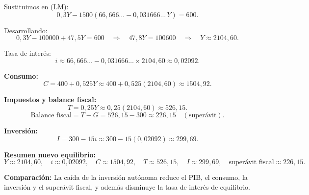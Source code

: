 \documentclass[11pt,addpoints]{article}
\begin{document}
Sustituimos en (LM):
\[
0{,}3Y - 1500\left(66{,}666\ldots - 0{,}031666\ldots\,Y\right) = 600.
\]

Desarrollando:
\[
0{,}3Y - 100000 + 47{,}5Y = 600
\quad\Rightarrow\quad
47{,}8Y = 100600
\quad\Rightarrow\quad
Y \approx 2104{,}60.
\]

Tasa de interés:
\[
i \approx 66{,}666\ldots - 0{,}031666\ldots \times 2104{,}60
\approx 0{,}02092.
\]

\textbf{Consumo:}
\[
C = 400 + 0{,}525Y \approx 400 + 0{,}525(2104{,}60) \approx 1504{,}92.
\]

\textbf{Impuestos y balance fiscal:}
\[
T = 0{,}25Y \approx 0{,}25(2104{,}60) \approx 526{,}15.
\]
\[
\text{Balance fiscal} = T - G = 526{,}15 - 300 \approx 226{,}15 \quad (\text{superávit}).
\]

\textbf{Inversión:}
\[
I = 300 - 15i \approx 300 - 15(0{,}02092) \approx 299{,}69.
\]

\textbf{Resumen nuevo equilibrio:}
\[
Y \approx 2104{,}60, \quad
i \approx 0{,}02092, \quad
C \approx 1504{,}92, \quad
T \approx 526{,}15, \quad
I \approx 299{,}69, \quad
\text{superávit fiscal} \approx 226{,}15.
\]

\textbf{Comparación:}  
La caída de la inversión autónoma reduce el PIB, el consumo, la inversión y el superávit fiscal, y además disminuye la tasa de interés de equilibrio.
\end{document}
